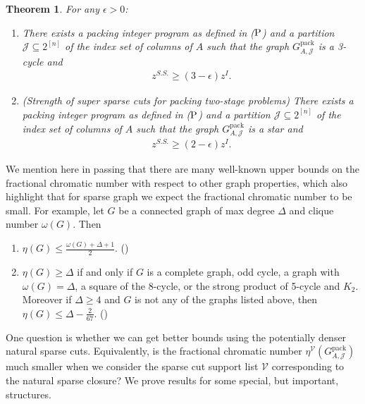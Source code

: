 \documentclass[smallextended]{svjour3}
\newtheorem{theorem}[proposition]{Theorem}
\begin{document}
\begin{theorem}\label{thm:brookstight}
For any $\epsilon > 0$:
\begin{enumerate}
\item There exists a packing integer program as defined in ($\textup{P}$) and a partition ${\mathcal{J}} \subseteq 2^{[n]}$ of the index set of columns of $A$ such that the graph ${G^{\textrm{pack}}_{A, {\mathcal{J}}}}$ is a 3-cycle and
\begin{eqnarray*}
z^{S.S.} \geq (3 - \epsilon) z^I.
\end{eqnarray*}
\item (Strength of super sparse cuts for packing two-stage problems)
There exists a packing integer program as defined in ($\textup{P}$) and a partition ${\mathcal{J}} \subseteq 2^{[n]}$ of the index set of columns of $A$ such that the graph ${G^{\textrm{pack}}_{A, {\mathcal{J}}}}$ is a star and
\begin{eqnarray*}
z^{S.S.} \geq (2 - \epsilon) z^I.
\end{eqnarray*}
\end{enumerate}
\end{theorem}

We mention here in passing that there are many well-known upper bounds on the fractional chromatic number with respect to other graph properties, which also highlight that for sparse graph we expect the fractional chromatic number to be small. For example, let $G$ be a connected graph of max degree $\Delta$ and clique number $\omega(G)$. Then
\begin{enumerate}
\item $\eta(G) \leq \frac{\omega(G) + \Delta + 1}{2}$. (\cite{MolReed})
\item $\eta(G) \geq \Delta$ if and only if $G$ is a complete graph, odd cycle, a graph with $\omega(G) = \Delta$, a square of the 8-cycle, or the strong product of 5-cycle and $K_2$. Moreover if $\Delta \geq 4$ and  $G$ is not any of the graphs listed above, then $\eta(G) \leq \Delta - \frac{2}{67}$. (\cite{KingLP12})
\end{enumerate}

One question is whether we can get better bounds using the potentially denser natural sparse cuts. Equivalently, is the fractional chromatic number $\eta^{\mathcal{V}}({G^{\textrm{pack}}_{A, {\mathcal{J}}}})$ much smaller when we consider the sparse cut support list $\mathcal{V}$ corresponding to the natural sparse closure? We prove results for some special, but important, structures.
\end{document}
